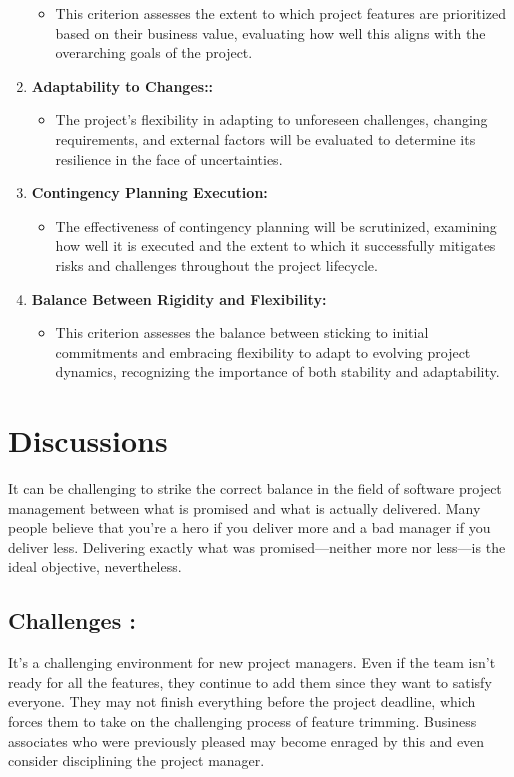 \documentclass[12pt]{article}
\begin{document}
\begin{enumerate}
\begin{itemize}
                    \item  This criterion assesses the extent to which project features are prioritized based on their business value, evaluating how well this aligns with the overarching goals of the project.
                \end{itemize}
        \item \textbf{Adaptability to Changes::}
                \begin{itemize}
                    \item The project's flexibility in adapting to unforeseen challenges, changing requirements, and external factors will be evaluated to determine its resilience in the face of uncertainties.
                \end{itemize}
        \item \textbf{Contingency Planning Execution:}
                \begin{itemize}
                    \item The effectiveness of contingency planning will be scrutinized, examining how well it is executed and the extent to which it successfully mitigates risks and challenges throughout the project lifecycle.
                \end{itemize}
        \item \textbf{Balance Between Rigidity and Flexibility:}
                \begin{itemize}
                    \item This criterion assesses the balance between sticking to initial commitments and embracing flexibility to adapt to evolving project dynamics, recognizing the importance of both stability and adaptability.
                \end{itemize}

                
    \end{enumerate}

\section{Discussions}
It can be challenging to strike the correct balance in the field of software project management between what is promised and what is actually delivered. Many people believe that you're a hero if you deliver more and a bad manager if you deliver less. Delivering exactly what was promised—neither more nor less—is the ideal objective, nevertheless.
\subsection{Challenges :}It's a challenging environment for new project managers. Even if the team isn't ready for all the features, they continue to add them since they want to satisfy everyone. They may not finish everything before the project deadline, which forces them to take on the challenging process of feature trimming. Business associates who were previously pleased may become enraged by this and even consider disciplining the project manager.
\end{document}
